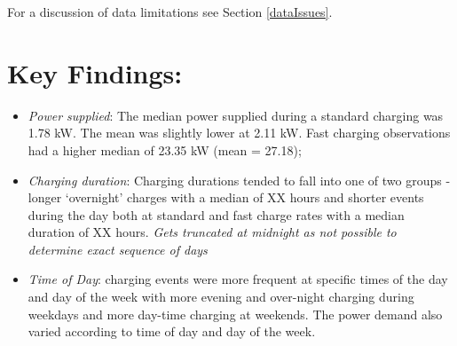 \documentclass[]{article}
\newenvironment{Shaded}{\begin{snugshade}}{\end{snugshade}}
\newcommand{\KeywordTok}[1]{\textcolor[rgb]{0.13,0.29,0.53}{\textbf{#1}}}
\newcommand{\DataTypeTok}[1]{\textcolor[rgb]{0.13,0.29,0.53}{#1}}
\newcommand{\StringTok}[1]{\textcolor[rgb]{0.31,0.60,0.02}{#1}}
\newcommand{\OtherTok}[1]{\textcolor[rgb]{0.56,0.35,0.01}{#1}}
\newcommand{\OperatorTok}[1]{\textcolor[rgb]{0.81,0.36,0.00}{\textbf{#1}}}
\newcommand{\NormalTok}[1]{#1}
\providecommand{\tightlist}{%
  \setlength{\itemsep}{0pt}\setlength{\parskip}{0pt}}
\begin{document}
For a discussion of data limitations see Section \ref{dataIssues}.

\section{Key Findings:}\label{key-findings}

\begin{Shaded}
\end{Shaded}

\begin{itemize}
\tightlist
\item
  \emph{Power supplied}: The median power supplied during a standard
  charging was 1.78 kW. The mean was slightly lower at 2.11 kW. Fast
  charging observations had a higher median of 23.35 kW (mean = 27.18);
\item
  \emph{Charging duration}: Charging durations tended to fall into one
  of two groups - longer `overnight' charges with a median of XX hours
  and shorter events during the day both at standard and fast charge
  rates with a median duration of XX hours. \emph{Gets truncated at
  midnight as not possible to determine exact sequence of days}
\item
  \emph{Time of Day}: charging events were more frequent at specific
  times of the day and day of the week with more evening and over-night
  charging during weekdays and more day-time charging at weekends. The
  power demand also varied according to time of day and day of the week.
\end{itemize}
\end{document}
